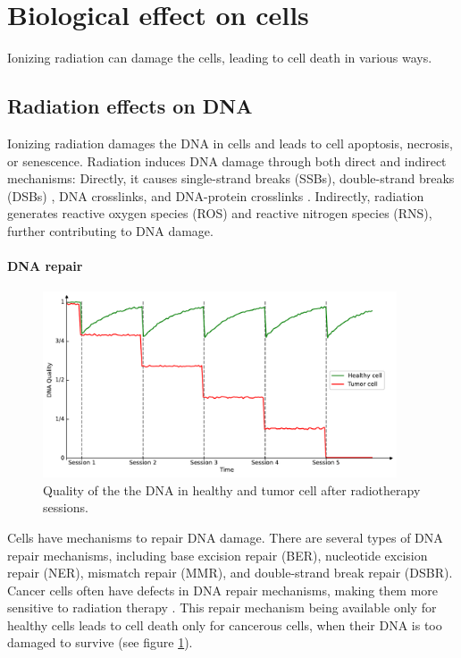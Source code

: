 \section{Biological effect on cells}
Ionizing radiation can damage the cells, leading to cell death in various ways.

\subsection{Radiation effects on DNA}
Ionizing radiation damages the DNA \cite{Scholes2014} in cells and leads to cell apoptosis, necrosis, or senescence.
Radiation induces DNA damage through both direct and indirect mechanisms:
Directly, it causes single-strand breaks (SSBs), double-strand breaks (DSBs) \cite{Roots1985}, DNA crosslinks, and DNA-protein crosslinks \cite{Nakano2017}.
Indirectly, radiation generates reactive oxygen species (ROS) and reactive nitrogen species (RNS), further contributing to DNA damage.

\paragraph{DNA repair}
\begin{figure}
	\centering
	\includegraphics[height=5.5cm]{_dna_quality.pdf}
	\caption{Quality of the the DNA in healthy and tumor cell after radiotherapy sessions.}
	\label{fig:dna_quality}
\end{figure}
Cells have mechanisms to repair DNA damage.
There are several types of DNA repair mechanisms, including base excision repair (BER), nucleotide excision repair (NER), mismatch repair (MMR), and double-strand break repair (DSBR).
Cancer cells often have defects in DNA repair mechanisms, making them more sensitive to radiation therapy \cite{Brierley2016}.
This repair mechanism being available only for healthy cells leads to cell death only for cancerous cells, when their DNA is too damaged to survive (see figure  \ref{fig:dna_quality}).

